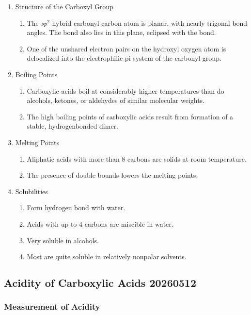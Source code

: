 \begin{enumerate}
    \item Structure of the Carboxyl Group
    \begin{enumerate}
        \item The \textit{sp}$^2$ hybrid carbonyl carbon atom is planar, with nearly trigonal bond angles. The  bond also lies in this plane, eclipsed with the  bond.
        \item One of the unshared electron pairs on the hydroxyl oxygen atom is delocalized into the electrophilic pi system of the carbonyl group.
    \end{enumerate}
    \item Boiling Points
    \begin{enumerate}
        \item Carboxylic acids boil at considerably higher temperatures than do alcohols, ketones, or aldehydes of similar molecular weights.
        \item The high boiling points of carboxylic acids result from formation of a stable, hydrogenbonded dimer.
    \end{enumerate}
    \item Melting Points
    \begin{enumerate}
        \item Aliphatic acids with more than 8 carbons are solids at room temperature.
        \item The presence of double bounds lowers the melting points. 
    \end{enumerate}
    \item Solubilities
    \begin{enumerate}
        \item Form hydrogen bond with water.
        \item Acids with up to 4 carbons are miscible in water.
        \item Very soluble in alcohols.
        \item Most are quite soluble in relatively nonpolar solvents.
    \end{enumerate}
\end{enumerate}

\subsection{Acidity of Carboxylic Acids 20260512}

\subsubsection{Measurement of Acidity}

